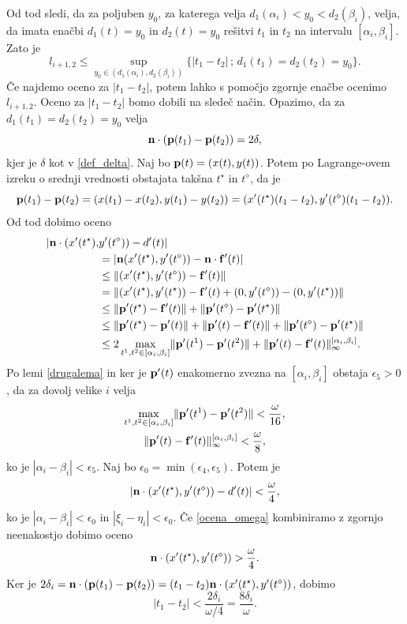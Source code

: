 Od tod sledi, da za poljuben $y_0$, za katerega velja $d_1(\alpha _i) < y_0 < d_2(\beta _i)$, velja, da imata enačbi $d_1(t)=y_0$ in $d_2(t) = y_0$ rešitvi $t_1$ in $t_2$ na intervalu $[\alpha _i, \beta _i]$. Zato je
$$
l_{i+1, 2} \leq \sup _{y_0\in (d_1(\alpha _i), d_2(\beta _i))} \{ |t_1-t_2|\, ; \, d_1(t_1)=d_2(t_2)=y_0\}.
$$
Če najdemo oceno za $|t_1-t_2|$, potem lahko s pomočjo zgornje enačbe ocenimo $l_{i+1,2}$. Oceno za $|t_1-t_2|$ bomo dobili na sledeč način. 
Opazimo, da za $d_1(t_1) = d_2(t_2) = y_0$ velja
$$
{\bf n}\cdot ({\bf p} (t_1) - {\bf p}(t_2)) = 2\delta,
$$
kjer je $\delta$ kot v \ref{def_delta}. Naj bo ${\bf p}(t)=(x(t),y(t))$. Potem po Lagrange-ovem izreku o srednji vrednosti obstajata takšna $t^{\star}$ in $t^{\diamond}$, da je
$$
{\bf p}(t_1) - {\bf p}(t_2) = (x(t_1) - x(t_2), y(t_1) - y(t_2)) = (x'(t^{\star})(t_1-t_2),y'(t^{\diamond})(t_1-t_2)).
$$
Od tod dobimo oceno
\begin{equation*}
\begin{split}
|{\bf n}\cdot(x'(t^{\star}), &y'(t^\diamond)) - d'(t)|  \\
& = |{\bf n} (x'(t^\star), y'(t^\diamond)) - {\bf n}\cdot {\bf f}'(t) | \\
& \leq \lVert (x'(t^\star), y'(t^\diamond)) - {\bf f}'(t)\rVert \\
& = \lVert (x'(t^\star),y'(t^\star)) - {\bf f}'(t) + (0, y'(t^\diamond)) - (0,y'(t^\star))\rVert \\
& \leq \lVert {\bf p}'(t^\star) - {\bf f}'(t)\rVert + \lVert {\bf p}'(t^\diamond) - {\bf p}'(t^\star)\rVert \\ 
& \leq \lVert {\bf p}'(t^\star) - {\bf p}'(t)\rVert + \lVert {\bf p}'(t) - {\bf f}'(t)\rVert + 
\lVert {\bf p}'(t^\diamond) - {\bf p}'(t^\star)\rVert \\
& \leq 2\max _{t^1,t^2\in [\alpha _i,\beta _i]} \lVert {\bf p}'(t^1) - {\bf p}'(t^2)\rVert + 
\lVert {\bf p}'(t) - {\bf f}'(t)\rVert _{\infty}^{[\alpha _i,\beta _i]}.
\end{split}
\end{equation*}
Po lemi \ref{drugalema} in ker je ${\bf p'}(t)$ enakomerno zvezna na $[\alpha _i,\beta _i]$ obstaja $\epsilon _5 > 0$, da za dovolj velike $i$ velja 
\begin{gather*}
\max _{t^1,t^2\in [\alpha _i,\beta _i]} \lVert {\bf p}'(t^1) - {\bf p}'(t^2)\rVert < \frac{\omega}{16},\\
\lVert {\bf p}'(t) - {\bf f}'(t)\rVert _{\infty}^{[\alpha _i,\beta _i]} < \frac{\omega}{8},
\end{gather*}
ko je $|\alpha _i - \beta _i| < \epsilon _5$. Naj bo $\epsilon _0 = \min (\epsilon _4, \epsilon _5)$. Potem je 
$$
|{\bf n}\cdot (x'(t^\star), y'(t^\diamond)) - d'(t)| < \frac{\omega}{4},
$$
ko je $|\alpha _i - \beta _i| < \epsilon _0$ in $|\xi _i - \eta _i| < \epsilon _0$.
Če \ref{ocena_omega} kombiniramo z zgornjo neenakostjo dobimo oceno
$$
{\bf n}\cdot (x'(t^\star), y'(t^\diamond)) > \frac{\omega}{4}.
$$
Ker je $2\delta _i = {\bf n}\cdot({\bf p}(t_1) - {\bf p}(t_2)) = (t_1-t_2){\bf n}\cdot(x'(t^\star),y'(t^\diamond))$, dobimo
$$
|t_1-t_2| < \frac{2\delta _i}{\omega /4 } = \frac{8\delta _i}{\omega}.
$$


